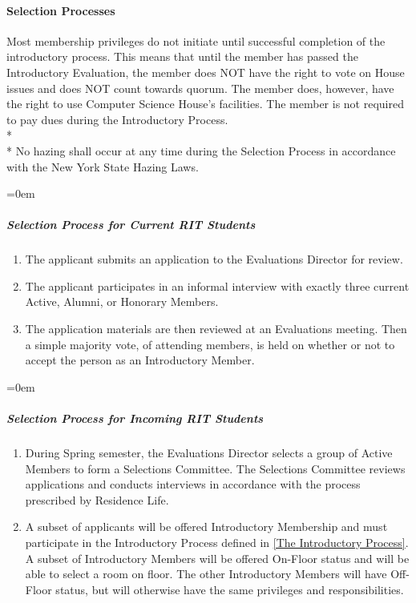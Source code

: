 \documentclass{article}
\newcommand{\asubsubsection}[1]{\paragraph{#1} \label{#1}}
\newcommand{\asubsubsubsection}[1]{\parindent=0em\subparagraph{#1} \label{#1}}
\begin{document}
\asubsubsection{Selection Processes}
\renewcommand{\theenumi}{\alph{enumi}} %
\hfill\break\hfill\break
Most membership privileges do not initiate until successful completion of the introductory process.
This means that until the member has passed the Introductory Evaluation, the member does NOT have the right to vote on House issues and does NOT count towards quorum.
The member does, however, have the right to use Computer Science House's facilities.
The member is not required to pay dues during the Introductory Process.
\\* \\*
No hazing shall occur at any time during the Selection Process in accordance with the New York State Hazing Laws.


\asubsubsubsection{Selection Process for Current RIT Students}
\begin{enumerate}
	\item The applicant submits an application to the Evaluations Director for review.
	\item The applicant participates in an informal interview with exactly three current Active, Alumni, or Honorary Members.
	\item The application materials are then reviewed at an Evaluations meeting.
	Then a simple majority vote, of attending members, is held on whether or not to accept the person as an Introductory Member.
\end{enumerate}
\asubsubsubsection{Selection Process for Incoming RIT Students}
\begin{enumerate}
	\item During Spring semester, the Evaluations Director selects a group of Active Members to form a Selections Committee.
		The Selections Committee reviews applications and conducts interviews in accordance with the process prescribed by Residence Life.
        \item A subset of applicants will be offered Introductory Membership and must participate in the Introductory Process defined in \ref{The Introductory Process}. 
            A subset of Introductory Members will be offered On-Floor status and will be able to select a room on floor. 
            The other Introductory Members will have Off-Floor status, but will otherwise have the same privileges and responsibilities.
\end{enumerate}
\end{document}
